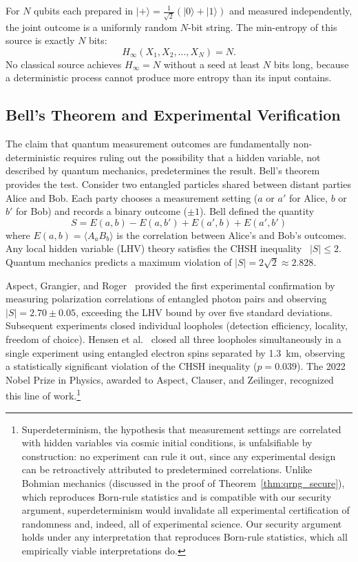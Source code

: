 \documentclass[journal]{IEEEtran}
\begin{document}
For $N$ qubits each prepared in $|{+}\rangle = \frac{1}{\sqrt{2}}(|0\rangle + |1\rangle)$ and measured independently, the joint outcome is a uniformly random $N$-bit string. The min-entropy of this source is exactly $N$ bits:
\begin{equation}
H_\infty(X_1, X_2, \ldots, X_N) = N.
\label{eq:minentropy}
\end{equation}
No classical source achieves $H_\infty = N$ without a seed at least $N$ bits long, because a deterministic process cannot produce more entropy than its input contains.

\subsection{Bell's Theorem and Experimental Verification}
\label{subsec:bell}

The claim that quantum measurement outcomes are fundamentally non-deterministic requires ruling out the possibility that a hidden variable, not described by quantum mechanics, predetermines the result. Bell's theorem~\cite{bell1964epr} provides the test. Consider two entangled particles shared between distant parties Alice and Bob. Each party chooses a measurement setting ($a$ or $a'$ for Alice, $b$ or $b'$ for Bob) and records a binary outcome ($\pm 1$). Bell defined the quantity
\begin{equation}
S = E(a, b) - E(a, b') + E(a', b) + E(a', b')
\label{eq:chsh}
\end{equation}
where $E(a, b) = \langle A_a B_b \rangle$ is the correlation between Alice's and Bob's outcomes. Any local hidden variable (LHV) theory satisfies the CHSH inequality~\cite{clauser1969chsh} $|S| \leq 2$. Quantum mechanics predicts a maximum violation of $|S| = 2\sqrt{2} \approx 2.828$.

Aspect, Grangier, and Roger~\cite{aspect1982epr} provided the first experimental confirmation by measuring polarization correlations of entangled photon pairs and observing $|S| = 2.70 \pm 0.05$, exceeding the LHV bound by over five standard deviations. Subsequent experiments closed individual loopholes (detection efficiency, locality, freedom of choice). Hensen et al.~\cite{hensen2015loophole} closed all three loopholes simultaneously in a single experiment using entangled electron spins separated by 1.3~km, observing a statistically significant violation of the CHSH inequality ($p = 0.039$). The 2022 Nobel Prize in Physics, awarded to Aspect, Clauser, and Zeilinger, recognized this line of work.\footnote{Superdeterminism, the hypothesis that measurement settings are correlated with hidden variables via cosmic initial conditions, is unfalsifiable by construction: no experiment can rule it out, since any experimental design can be retroactively attributed to predetermined correlations. Unlike Bohmian mechanics (discussed in the proof of Theorem~\ref{thm:qrng_secure}), which reproduces Born-rule statistics and is compatible with our security argument, superdeterminism would invalidate all experimental certification of randomness and, indeed, all of experimental science. Our security argument holds under any interpretation that reproduces Born-rule statistics, which all empirically viable interpretations do.}
\end{document}
